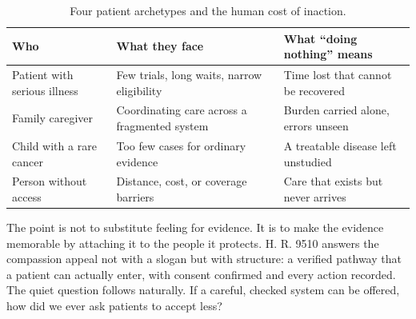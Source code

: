 \begin{table}[H]
\footnotesize
\begin{tabularx}{\textwidth}{@{}L{3.2cm} Y L{4.2cm}@{}}
\toprule
\textbf{Who} & \textbf{What they face} & \textbf{What ``doing nothing'' means}\\
\midrule
Patient with serious illness & Few trials, long waits, narrow eligibility & Time lost that cannot be recovered\\
Family caregiver & Coordinating care across a fragmented system & Burden carried alone, errors unseen\\
Child with a rare cancer & Too few cases for ordinary evidence & A treatable disease left unstudied\\
Person without access & Distance, cost, or coverage barriers & Care that exists but never arrives\\
\bottomrule
\end{tabularx}
\caption{Four patient archetypes and the human cost of inaction.}
\label{tab:compassion}
\end{table}

The point is not to substitute feeling for evidence. It is to make the evidence
memorable by attaching it to the people it protects. H. R. 9510 answers the
compassion appeal not with a slogan but with structure: a verified pathway that a
patient can actually enter, with consent confirmed and every action recorded. The
quiet question follows naturally. If a careful, checked system can be offered, how
did we ever ask patients to accept less?
